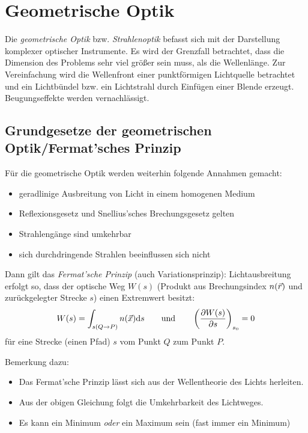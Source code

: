 \chapter{Geometrische Optik}
Die \emph{geometrische Optik}
bzw. \emph{Strahlenoptik} befasst sich mit der
Darstellung komplexer optischer Instrumente.
Es wird der Grenzfall betrachtet, dass die Dimension des Problems sehr
viel größer sein muss, als die Wellenlänge.
Zur Vereinfachung wird die Wellenfront einer punktförmigen Lichtquelle
betrachtet und ein Lichtbündel bzw. ein Lichtstrahl durch Einfügen
einer Blende erzeugt. Beugungseffekte werden vernachlässigt.

\section[Fermat'sches Prinzip]
{Grundgesetze der geometrischen Optik/Fermat'sches Prinzip}
Für die geometrische Optik werden weiterhin folgende Annahmen gemacht:
\begin{itemize}
\item geradlinige Ausbreitung von Licht in einem homogenen Medium
\item Reflexionsgesetz und Snellius'sches Brechungsgesetz gelten
\item Strahlengänge sind umkehrbar
\item sich durchdringende Strahlen beeinflussen sich nicht
\end{itemize}
Dann gilt das \emph{Fermat'sche Prinzip}
(auch Variationsprinzip):
Lichtausbreitung erfolgt so, dass der optische Weg $W(s)$%
(Produkt aus Brechungsindex $n(\vecr)$ und zurückgelegter Strecke
$s$) einen Extremwert besitzt:
\begin{gather*}
  W(s) = \int_{s(Q\to P)}n(\vecx)\dd s
  \qquad\text{und}\qquad
  \left( \dif[W(s)]{s} \right)_{s_0} = 0
\end{gather*}%
%
für eine Strecke (einen Pfad) $s$ vom Punkt $Q$ zum Punkt $P$.

Bemerkung dazu:
\begin{itemize}
\item Das Fermat'sche Prinzip lässt sich aus der Wellentheorie des
  Lichts herleiten.
\item Aus der obigen Gleichung folgt die Umkehrbarkeit des Lichtweges.
\item Es kann ein Minimum \emph{oder} ein Maximum sein (fast immer ein
  Minimum)
\end{itemize}

